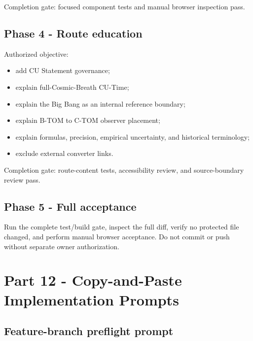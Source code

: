 \documentclass[11pt,letterpaper]{article}
\begin{document}
Completion gate: focused component tests and manual browser inspection pass.

\subsection{Phase 4 - Route education}

Authorized objective:

\begin{itemize}
    \item add CU Statement governance;
    \item explain full-Cosmic-Breath CU-Time;
    \item explain the Big Bang as an internal reference boundary;
    \item explain B-TOM to C-TOM observer placement;
    \item explain formulas, precision, empirical uncertainty, and historical terminology;
    \item exclude external converter links.
\end{itemize}

Completion gate: route-content tests, accessibility review, and source-boundary
review pass.

\subsection{Phase 5 - Full acceptance}

Run the complete test/build gate, inspect the full diff, verify no protected
file changed, and perform manual browser acceptance. Do not commit or push
without separate owner authorization.

\section{Part 12 - Copy-and-Paste Implementation Prompts}

\subsection{Feature-branch preflight prompt}
\end{document}
